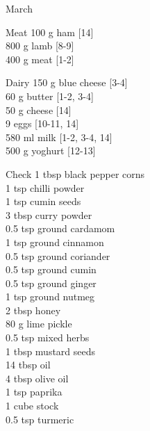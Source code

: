 \begin{menu}{March}
      \begin{shoppinglist}{Meat}
      100 g ham {\scriptsize[14]}\\
      800 g lamb {\scriptsize[8-9]}\\
      400 g meat {\scriptsize[1-2]}\\
      \end{shoppinglist}%
      \begin{shoppinglist}{Dairy}
      150 g blue cheese {\scriptsize[3-4]}\\
      60 g butter {\scriptsize[1-2, 3-4]}\\
      50 g cheese {\scriptsize[14]}\\
      9  eggs {\scriptsize[10-11, 14]}\\
      580 ml milk {\scriptsize[1-2, 3-4, 14]}\\
      500 g yoghurt {\scriptsize[12-13]}\\
      \end{shoppinglist}%
      \par\vfil %
      \vfil\clearpage %
      \begin{shoppinglist}{Check}
      1 tbsp black pepper corns \\
      1 tsp chilli powder \\
      1 tsp cumin seeds \\
      3 tbsp curry powder \\
      0.5 tsp ground cardamom \\
      1 tsp ground cinnamon \\
      0.5 tsp ground coriander \\
      0.5 tsp ground cumin \\
      0.5 tsp ground ginger \\
      1 tsp ground nutmeg \\
      2 tbsp honey \\
      80 g lime pickle \\
      0.5 tsp mixed herbs \\
      1 tbsp mustard seeds \\
      14 tbsp oil \\
      4 tbsp olive oil \\
      1 tsp paprika \\
      1 cube stock \\
      0.5 tsp turmeric \\
      \end{shoppinglist}%

\end{menu}
